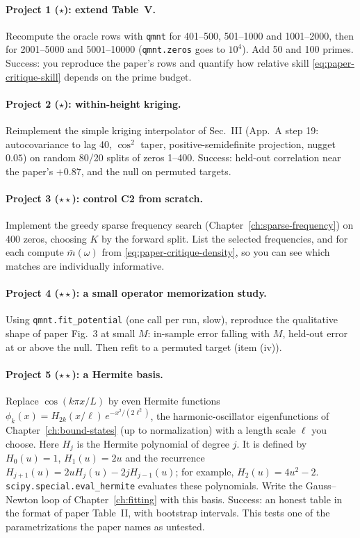 \paragraph{Project 1 ($\star$): extend Table~V.} Recompute the oracle rows with \texttt{qmnt} for 401--500, 501--1000 and 1001--2000, then for 2001--5000 and 5001--10000 (\texttt{qmnt.zeros} goes to $10^4$). Add 50 and 100 primes. Success: you reproduce the paper's rows and quantify how relative skill \eqref{eq:paper-critique-skill} depends on the prime budget.

\paragraph{Project 2 ($\star$): within-height kriging.} Reimplement the simple kriging interpolator of Sec.~III (App.~A step 19: autocovariance to lag 40, $\cos^2$ taper, positive-semidefinite projection, nugget $0.05$) on random 80/20 splits of zeros 1--400. Success: held-out correlation near the paper's $+0.87$, and the null on permuted targets.

\paragraph{Project 3 ($\star\star$): control C2 from scratch.} Implement the greedy sparse frequency search (Chapter~\ref{ch:sparse-frequency}) on 400 zeros, choosing $K$ by the forward split. List the selected frequencies, and for each compute $\bar m(\omega)$ from \eqref{eq:paper-critique-density}, so you can see which matches are individually informative.

\paragraph{Project 4 ($\star\star$): a small operator memorization study.} Using \texttt{qmnt.fit\_potential} (one call per run, slow), reproduce the qualitative shape of paper Fig.~3 at small $M$: in-sample error falling with $M$, held-out error at or above the null. Then refit to a permuted target (item (iv)).

\paragraph{Project 5 ($\star\star$): a Hermite basis.} Replace $\cos(k\pi x/L)$ by even Hermite functions $\phi_k(x)=H_{2k}(x/\ell)\,e^{-x^2/(2\ell^2)}$, the harmonic-oscillator eigenfunctions of Chapter~\ref{ch:bound-states} (up to normalization) with a length scale $\ell$ you choose. Here $H_j$ is the Hermite polynomial of degree $j$. It is defined by $H_0(u)=1$, $H_1(u)=2u$ and the recurrence $H_{j+1}(u)=2uH_j(u)-2jH_{j-1}(u)$; for example, $H_2(u)=4u^2-2$. \texttt{scipy.special.eval\_hermite} evaluates these polynomials. Write the Gauss--Newton loop of Chapter~\ref{ch:fitting} with this basis. Success: an honest table in the format of paper Table~II, with bootstrap intervals. This tests one of the parametrizations the paper names as untested.

